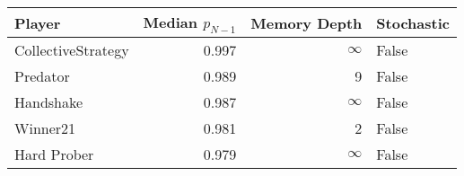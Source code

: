\begin{tabular}{lrrl}
\toprule
             Player &  Median $p_{N-1}$ &  Memory Depth & Stochastic \\
\midrule
 CollectiveStrategy &             0.997 &            \(\infty\) &      False \\
           Predator &             0.989 &             9 &      False \\
          Handshake &             0.987 &            \(\infty\) &      False \\
           Winner21 &             0.981 &             2 &      False \\
        Hard Prober &             0.979 &            \(\infty\) &      False \\
\bottomrule
\end{tabular}
